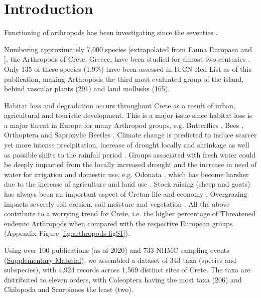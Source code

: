 \section{Introduction}
\label{sec:arthropods-intro}

Functioning of arthropods has been investigating since the seventies \parencite{rosswall1997energetical}.

Numbering approximately 7,000 species [extrapolated from Fauna Europaea
\parencite{jong2014fauna} and \textcite{legakis2018}], the Arthropods of Crete, Greece,
have been studied for almost two centuries \parencite{Anastasiou2018Tenebrionid}.
Only 135 of these species (1.9\%) have been assessed in IUCN Red List as of
this publication, making Arthropods the third most evaluated group of the
island, behind vascular plants (291) and land mollusks (165).

Habitat loss and degradation occurs throughout Crete as a result of urban,
agricultural and touristic development. This is a major issue since habitat
loss is a major threat in Europe for many Arthropod groups,
e.g. Butterflies \parencite{VanSwaaycommission2010european}, Bees \parencite{nieto2014},
Orthoptera \parencite{hochkirch2016} and Saproxylic Beetles \parencite{Calix_2018}.
Climate change is predicted to induce scarcer yet more intense precipitation,
increase of drought locally \parencite{koutroulis2011spatiotemporal} and shrinkage as well as
possible shifts to the rainfall period \parencite{koutroulis2013impact}. Groups
associated with fresh water could be deeply impacted from the locally increased
drought and the increase in need of water for irrigation and domestic use,
e.g. Odonata \parencite{kalkman2010}, which has become harsher due to the
increase of agriculture and land use \parencite{tzanakakis2020challenges}. Stock raising
(sheep and goats) has always been an important aspect of Cretan life and
economy \parencite{rackham1996the-making}. Overgrazing impacts severely soil erosion,
soil moisture and vegetation \parencite{kosmas2015exploring,orestis2015exploring}. All the
above contribute to a worrying trend for Crete, i.e. the higher percentage of
Threatened endemic Arthropods when compared with the respective European
groups (Appendix Figure \ref{fig:arthropods-figS1}).

Using over 100 publications (as of 2020) and 733 NHMC sampling events
(\href{https://doi.org/10.5281/zenodo.10635645}{Supplementary Material}), we assembled a dataset of 343 taxa (species and subspecies),
with 4,924 records across 1,569 distinct sites of Crete. The taxa
are distributed to eleven orders, with Coleoptera having the most taxa (206)
and Chilopoda and Scorpiones the least (two).

